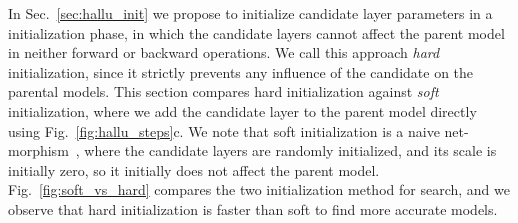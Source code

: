 \documentclass{article}
\begin{document}
In Sec.~\ref{sec:hallu_init} we propose to initialize candidate layer parameters in a initialization phase, in which the candidate layers cannot affect the parent model in neither forward or backward operations. We call this approach \emph{hard} initialization, since it strictly prevents any influence of the candidate on the parental models. This section compares hard initialization against \emph{soft} initialization, where we add the candidate layer to the parent model directly using Fig.~\ref{fig:hallu_steps}c. We note that soft initialization is a naive net-morphism~\citep{netmorph}, where the candidate layers are randomly initialized, and its scale is initially zero, so it initially does not affect the parent model. 
Fig.~\ref{fig:soft_vs_hard} compares the two initialization method for search, and we observe that hard initialization is faster than soft to find more accurate models.
\end{document}
